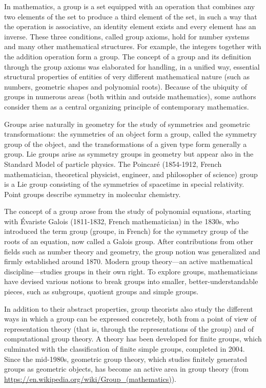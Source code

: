 \documentclass{article}
\begin{document}
\begin{tcolorbox}
  In mathematics, a group is a set equipped with an operation that combines any two elements of the set to produce a third element of the set, in such a way that the operation is associative, an identity element exists and every element has an inverse. These three conditions, called group axioms, hold for number systems and many other mathematical structures. For example, the integers together with the addition operation form a group. The concept of a group and its definition through the group axioms was elaborated for handling, in a unified way, essential structural properties of entities of very different mathematical nature (such as numbers, geometric shapes and polynomial roots). Because of the ubiquity of groups in numerous areas (both within and outside mathematics), some authors consider them as a central organizing principle of contemporary mathematics.
\end{tcolorbox}

\begin{tcolorbox}
  Groups arise naturally in geometry for the study of symmetries and geometric transformations: the symmetries of an object form a group, called the symmetry group of the object, and the transformations of a given type form generally a group. Lie groups arise as symmetry groups in geometry but appear also in the Standard Model of particle physics. The Poincaré (1854-1912, French mathematician, theoretical physicist, engineer, and philosopher of science) group is a Lie group consisting of the symmetries of spacetime in special relativity. Point groups describe symmetry in molecular chemistry.
  
  The concept of a group arose from the study of polynomial equations, starting with Évariste Galois (1811-1832, French mathematician) in the 1830s, who introduced the term group (groupe, in French) for the symmetry group of the roots of an equation, now called a Galois group. After contributions from other fields such as number theory and geometry, the group notion was generalized and firmly established around 1870. Modern group theory—an active mathematical discipline—studies groups in their own right. To explore groups, mathematicians have devised various notions to break groups into smaller, better-understandable pieces, such as subgroups, quotient groups and simple groups.
\end{tcolorbox}

\begin{tcolorbox}
  In addition to their abstract properties, group theorists also study the different ways in which a group can be expressed concretely, both from a point of view of representation theory (that is, through the representations of the group) and of computational group theory. A theory has been developed for finite groups, which culminated with the classification of finite simple groups, completed in 2004. Since the mid-1980s, geometric group theory, which studies finitely generated groups as geometric objects, has become an active area in group theory (from \url{https://en.wikipedia.org/wiki/Group_(mathematics)}).
\end{tcolorbox}
\end{document}
